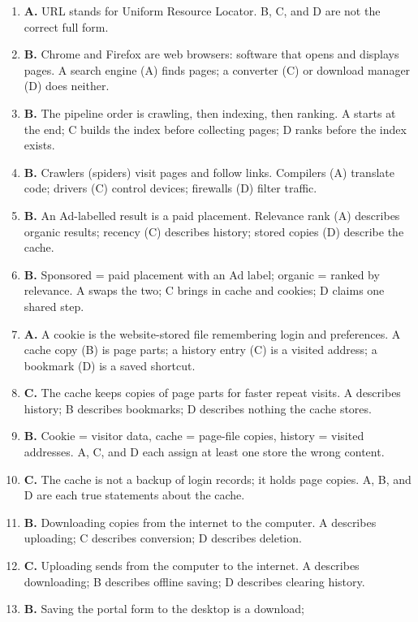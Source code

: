 \begin{enumerate}[label=\textbf{Q\arabic*.}, leftmargin=*]
\item \textbf{A.} URL stands for Uniform Resource Locator. B, C, and D are
  not the correct full form.
\item \textbf{B.} Chrome and Firefox are web browsers: software that opens
  and displays pages. A search engine (A) finds pages; a converter (C) or
  download manager (D) does neither.
\item \textbf{B.} The pipeline order is crawling, then indexing, then
  ranking. A starts at the end; C builds the index before collecting pages;
  D ranks before the index exists.
\item \textbf{B.} Crawlers (spiders) visit pages and follow links. Compilers
  (A) translate code; drivers (C) control devices; firewalls (D) filter
  traffic.
\item \textbf{B.} An Ad-labelled result is a paid placement. Relevance rank
  (A) describes organic results; recency (C) describes history; stored copies
  (D) describe the cache.
\item \textbf{B.} Sponsored = paid placement with an Ad label; organic =
  ranked by relevance. A swaps the two; C brings in cache and cookies; D
  claims one shared step.
\item \textbf{A.} A cookie is the website-stored file remembering login and
  preferences. A cache copy (B) is page parts; a history entry (C) is a
  visited address; a bookmark (D) is a saved shortcut.
\item \textbf{C.} The cache keeps copies of page parts for faster repeat
  visits. A describes history; B describes bookmarks; D describes nothing the
  cache stores.
\item \textbf{B.} Cookie = visitor data, cache = page-file copies, history =
  visited addresses. A, C, and D each assign at least one store the wrong
  content.
\item \textbf{C.} The cache is not a backup of login records; it holds page
  copies. A, B, and D are each true statements about the cache.
\item \textbf{B.} Downloading copies from the internet to the computer.
  A describes uploading; C describes conversion; D describes deletion.
\item \textbf{C.} Uploading sends from the computer to the internet.
  A describes downloading; B describes offline saving; D describes clearing
  history.
\item \textbf{B.} Saving the portal form to the desktop is a download;

\end{enumerate}

